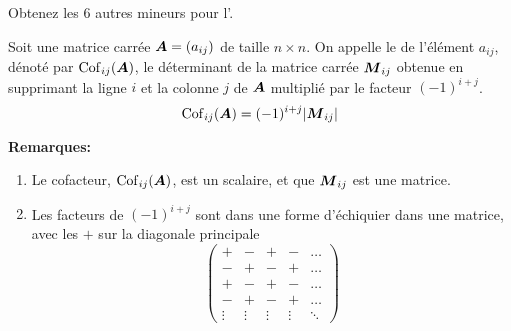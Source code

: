 \begin{exerciceC}
Obtenez les 6 autres mineurs pour l'.
\end{exerciceC}

\begin{defini}
Soit une matrice carrée $\boldsymbol{A} = (a_{ij})$ de taille $n\times  n$.
On appelle le  de l'élément $a_{ij}$, dénoté par $\operatorname{Cof}_{ij}(\boldsymbol{A})$, le déterminant de la matrice carrée $\boldsymbol{M}_{ij}$  obtenue en
supprimant la ligne $i$ et la colonne $j$ de $\boldsymbol{A}$ multiplié par le facteur $(-1)^{i+j}$. 
\[
\operatorname{Cof}_{ij}(\boldsymbol{A}) = (-1)^{i+j} |\boldsymbol{M}_{ij}|
\]
\end{defini}
\textbf{Remarques:}
\begin{enumerate}
\item Le cofacteur, $\operatorname{Cof}_{ij}(\boldsymbol{A})$, est un scalaire, et que $\boldsymbol{M}_{ij}$ est une matrice.
\item Les facteurs de $(-1)^{i+j}$ sont dans une forme d'échiquier dans une matrice, avec les $+$ sur la diagonale principale
\[
\begin{pmatrix}
+ & - & + & - & \ldots \\
- & + & - & + & \ldots \\
+ & - & + & - & \ldots \\
- & + & - & + & \ldots \\
\vdots & \vdots & \vdots & \vdots & \ddots
\end{pmatrix}
\]
\end{enumerate}


